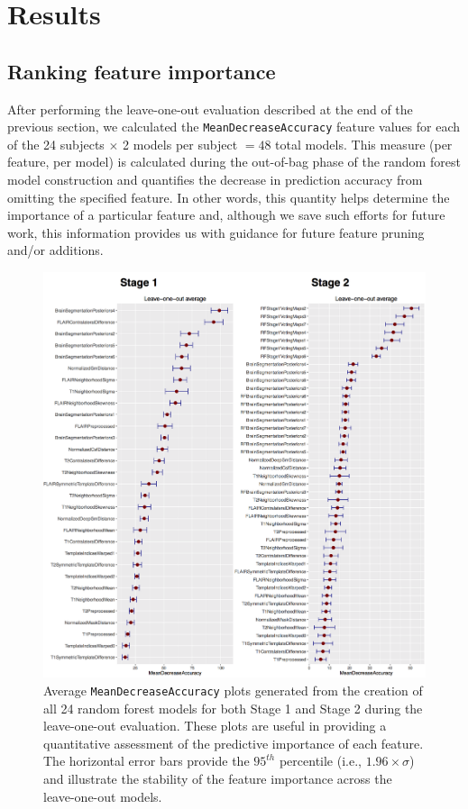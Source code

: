 \documentclass[11pt,]{article}
\begin{document}
\section{Results}\label{results}

\subsection{Ranking feature
importance}\label{ranking-feature-importance}

After performing the leave-one-out evaluation described at the end of
the previous section, we calculated the \texttt{MeanDecreaseAccuracy}
feature values for each of the 24 subjects \(\times\) 2 models per
subject \(=48\) total models. This measure (per feature, per model) is
calculated during the out-of-bag phase of the random forest model
construction and quantifies the decrease in prediction accuracy from
omitting the specified feature. In other words, this quantity helps
determine the importance of a particular feature and, although we save
such efforts for future work, this information provides us with guidance
for future feature pruning and/or additions.

\begin{figure}[htbp]
\centering
\includegraphics{Figures/averageLeaveOneOut.png}
\caption{Average \texttt{MeanDecreaseAccuracy} plots generated from the
creation of all 24 random forest models for both Stage 1 and Stage 2
during the leave-one-out evaluation. These plots are useful in providing
a quantitative assessment of the predictive importance of each feature.
The horizontal error bars provide the \(95^{th}\) percentile (i.e.,
\(1.96 \times \sigma\)) and illustrate the stability of the feature
importance across the leave-one-out models.}
\end{figure}
\end{document}
